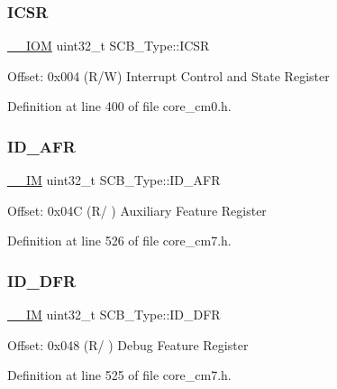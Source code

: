 \subsubsection{\texorpdfstring{I\+C\+SR}{ICSR}}
{\footnotesize\ttfamily \hyperlink{core__sc300_8h_ab6caba5853a60a17e8e04499b52bf691}{\+\_\+\+\_\+\+I\+OM} uint32\+\_\+t S\+C\+B\+\_\+\+Type\+::\+I\+C\+SR}

Offset\+: 0x004 (R/W) Interrupt Control and State Register 

Definition at line 400 of file core\+\_\+cm0.\+h.

\mbox{\label{struct_s_c_b___type_a9c9a1d805f8e99b9fd3ab4f455b6333a}} 
\subsubsection{\texorpdfstring{I\+D\+\_\+\+A\+FR}{ID\_AFR}}
{\footnotesize\ttfamily \hyperlink{core__sc300_8h_a4cc1649793116d7c2d8afce7a4ffce43}{\+\_\+\+\_\+\+IM} uint32\+\_\+t S\+C\+B\+\_\+\+Type\+::\+I\+D\+\_\+\+A\+FR}

Offset\+: 0x04C (R/ ) Auxiliary Feature Register 

Definition at line 526 of file core\+\_\+cm7.\+h.

\mbox{\label{struct_s_c_b___type_ada1d3119c020983fdc949c2ccd406caa}} 
\subsubsection{\texorpdfstring{I\+D\+\_\+\+D\+FR}{ID\_DFR}}
{\footnotesize\ttfamily \hyperlink{core__sc300_8h_a4cc1649793116d7c2d8afce7a4ffce43}{\+\_\+\+\_\+\+IM} uint32\+\_\+t S\+C\+B\+\_\+\+Type\+::\+I\+D\+\_\+\+D\+FR}

Offset\+: 0x048 (R/ ) Debug Feature Register 

Definition at line 525 of file core\+\_\+cm7.\+h.

\mbox{\label{struct_s_c_b___type_ac729a357cdd968020fdb5c35bdfc4916}} 
